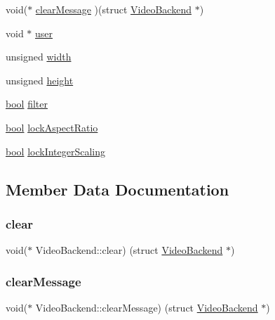 \begin{DoxyCompactItemize}
\item 
void($\ast$ \mbox{\hyperlink{struct_video_backend_ab5a24d9cb16d8185f9377b1442d0579b}{clear\+Message}} )(struct \mbox{\hyperlink{struct_video_backend}{Video\+Backend}} $\ast$)
\item 
void $\ast$ \mbox{\hyperlink{struct_video_backend_a825c0ad8dc1cb037c5c467f5d7b5dc48}{user}}
\item 
unsigned \mbox{\hyperlink{struct_video_backend_a462affa3c14c45e8b0dae4c5f8dfa205}{width}}
\item 
unsigned \mbox{\hyperlink{struct_video_backend_a163ee12ec8ae96107bca8e4f95f783eb}{height}}
\item 
\mbox{\hyperlink{libretro_8h_a4a26dcae73fb7e1528214a068aca317e}{bool}} \mbox{\hyperlink{struct_video_backend_a700c7d1eba11258b9bd05cfddc81b237}{filter}}
\item 
\mbox{\hyperlink{libretro_8h_a4a26dcae73fb7e1528214a068aca317e}{bool}} \mbox{\hyperlink{struct_video_backend_abf7b35416a021f9bfeb989f1efe74a34}{lock\+Aspect\+Ratio}}
\item 
\mbox{\hyperlink{libretro_8h_a4a26dcae73fb7e1528214a068aca317e}{bool}} \mbox{\hyperlink{struct_video_backend_aaa4f6337d11f985b14444652280650de}{lock\+Integer\+Scaling}}
\end{DoxyCompactItemize}


\subsection{Member Data Documentation}
\mbox{\label{struct_video_backend_a57a12d9a062df2b35b06e8d3f4be31b0}} 
\subsubsection{\texorpdfstring{clear}{clear}}
{\footnotesize\ttfamily void($\ast$ Video\+Backend\+::clear) (struct \mbox{\hyperlink{struct_video_backend}{Video\+Backend}} $\ast$)}

\mbox{\label{struct_video_backend_ab5a24d9cb16d8185f9377b1442d0579b}} 
\subsubsection{\texorpdfstring{clear\+Message}{clearMessage}}
{\footnotesize\ttfamily void($\ast$ Video\+Backend\+::clear\+Message) (struct \mbox{\hyperlink{struct_video_backend}{Video\+Backend}} $\ast$)}


